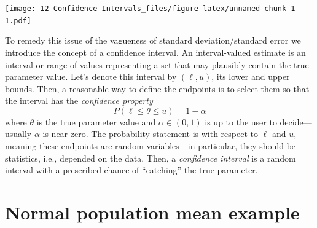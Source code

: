 \documentclass[]{book}
\begin{document}
\texttt{[image: 12-Confidence-Intervals\_files/figure-latex/unnamed-chunk-1-1.pdf]}

To remedy this issue of the vagueness of standard deviation/standard
error we introduce the concept of a confidence interval. An
interval-valued estimate is an interval or range of values representing
a set that may plausibly contain the true parameter value. Let's denote
this interval by \((\ell, u)\), its lower and upper bounds. Then, a
reasonable way to define the endpoints is to select them so that the
interval has the \emph{confidence property}
\[P(\ell \leq \theta \leq u) = 1-\alpha\] where \(\theta\) is the true
parameter value and \(\alpha \in (0,1)\) is up to the user to
decide---usually \(\alpha\) is near zero. The probability statement is
with respect to \(\ell\) and \(u\), meaning these endpoints are random
variables---in particular, they should be statistics, i.e., depended on
the data. Then, a \emph{confidence interval} is a random interval with a
prescribed chance of ``catching'' the true parameter.

\section{Normal population mean
example}\label{normal-population-mean-example}
\end{document}
